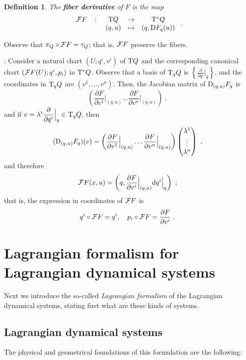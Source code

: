 \documentclass[12pt]{report}
\newtheorem{definition}[teor]{Definition}
\def\dst{\displaystyle}
\def\derpar#1#2{\frac{\partial{#1}}{\partial{#2}}}
\def\d{{\rm d}}
\def\Tan{{\rm T}}
\begin{document}
\begin{definition}
The \textbf{fiber derivative} of $F$ is the map
$$
\begin{array}{ccccc}
{\cal F}F & \colon & \Tan Q & \to & \Tan^*Q
\\
 & & (q,u) & \mapsto & (q,{\rm D}F_q(u))
\end{array} \ .
$$
\end{definition}

Observe that $\pi_Q \circ{\cal F}F = \tau_Q$;
that is, ${\cal F}F$ preserve the fibers.

:
Consider a natural chart $(U;q^i,v^i)$ of $\Tan Q$
and the corresponding canonical chart $({\cal F}F(U);q^i,p_i)$ in $\Tan^* Q$.
Observe that a basis of $\Tan_qQ$ is
\(\dst \left\{ \derpar{}{q^i}\Big\vert_q\right\} \),
and the coordinates in $\Tan_qQ$ are $(v^1,\ldots ,v^n)$.
Then, the Jacobian matrix of ${\rm D}_{(q,u )}F_q$ is
$$
\left( \derpar{F}{v^1}\Big\vert_{(q,u)} \ldots
\derpar{F}{v^n}\Big\vert_{(q,u)} \right) \ ,
$$
and if  \(\dst v=\lambda^i\derpar{}{q^i}\Big\vert_q \in \Tan_qQ\), then
$$
({\rm D}_{(q,u)}F_q)(v) =
\left( \derpar{F}{v^1}\Big\vert_{(q,u)} \ldots
\derpar{F}{v^n}\Big\vert_{(q,u)} \right)
\left(\begin{matrix}\lambda^1 \\ \vdots \\ \lambda^n \end{matrix}\right)\ ,
$$
and therefore
$$
 {\cal F}F(x,u) = \left( q,\derpar{F}{v^i}\Big\vert_{(q,u)}\d q^i
\Big\vert_q\right) \ ;
$$
that is, the expression in coordinates of ${\cal F}F$ is
$$
q^i \circ{\cal F}F = q^i ,\quad p_i \circ{\cal F}F =\derpar{F}{v^i}
\ .
$$


\section{Lagrangian formalism for Lagrangian dynamical systems}


Next we introduce the so-called {\sl Lagrangian formalism} of the
Lagrangian dynamical systems,
stating first what are these kinds of systems.


\subsection{Lagrangian dynamical systems}
\label{poslagdyn}


The physical and geometrical foundations of this formulation are the following:
\end{document}
